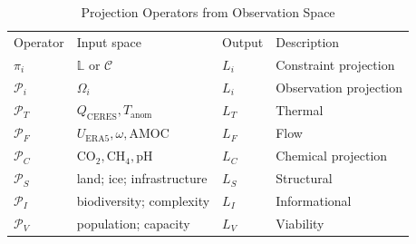 \begin{table}[tb]
\caption{\label{tab:projection_operators}Projection Operators from Observation Space}
\footnotesize
\begin{ruledtabular}
\begin{tabular}{llll}
Operator & Input space & Output & Description \\
\(\pi_i\) & \(\mathbb{L}\) or \(\mathcal{C}\) & \(L_i\) & Constraint projection \\
\(\mathcal{P}_i\) & \(\Omega_i\) & \(L_i\) & Observation projection \\
\(\mathcal{P}_T\) & \(Q_{\mathrm{CERES}},T_{\mathrm{anom}}\) & \(L_T\) & Thermal \\
\(\mathcal{P}_F\) & \(U_{\mathrm{ERA5}},\omega,\mathrm{AMOC}\) & \(L_F\) & Flow \\
\(\mathcal{P}_C\) & \(\mathrm{CO}_2,\mathrm{CH}_4,\mathrm{pH}\) & \(L_C\) & Chemical projection \\
\(\mathcal{P}_S\) & land; ice; infrastructure & \(L_S\) & Structural \\
\(\mathcal{P}_I\) & biodiversity; complexity & \(L_I\) & Informational \\
\(\mathcal{P}_V\) & population; capacity & \(L_V\) & Viability \\
\end{tabular}
\end{ruledtabular}
\end{table}
